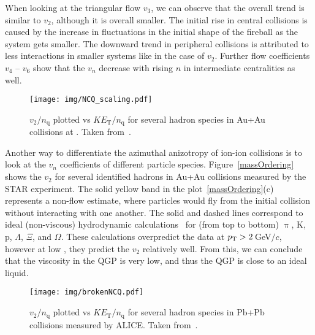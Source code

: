 When looking at the triangular flow $v_3$, we can observe that the overall trend is similar to $v_2$, although it is overall smaller. The initial rise in central collisions is caused by the increase in fluctuations in the initial shape of the fireball as the system gets smaller. The downward trend in peripheral collisions is attributed to less interactions in smaller systems like in the case of $v_2$\@. Further flow coefficients $v_4$ -- $v_6$ show that the $v_n$ decrease with rising $n$ in intermediate centralities as well.


 
\begin{figure}[!htb]
\centering
\texttt{[image: img/NCQ\_scaling.pdf]}
\caption[$v_2/n_\mathrm{q}$ plotted vs $K E_\mathrm{T}/n_\mathrm{q}$ for several hadron species in Au+Au collisions.]{\label{NCQscaling}$v_2/n_\mathrm{q}$ plotted vs $K E_\mathrm{T}/n_\mathrm{q}$ for several hadron species in Au+Au collisions at \snnFull\@. Taken from~\cite{NCQscalingPhenix}.}

\end{figure}


Another way to differentiate the azimuthal anizotropy of ion-ion collisions is to look at the $v_n$ coefficients of different particle species. Figure~\ref{massOrdering} shows the $v_2$ for several identified hadrons in Au+Au collisions measured by the STAR experiment. The solid yellow band in the plot~\ref{massOrdering}(c) represents a non-flow estimate, where particles would fly from the initial collision without interacting with one another. The solid and dashed lines correspond to ideal (non-viscous) hydrodynamic calculations~\cite{idealHydroReview} for (from top to bottom) $\uppi$, K, p, $\Lambda$, $\Xi$, and $\Omega$\@. These calculations overpredict the data at ${p_{\mathrm{T}}} > 2\,$GeV$/c$, however at low \pt, they predict the $v_2$ relatively well. From this, we can conclude that the viscosity in the QGP is very low, and thus the QGP is close to an ideal liquid. 


\begin{figure}[!htb]
\centering
\texttt{[image: img/brokenNCQ.pdf]}
\caption[$v_2/n_\mathrm{q}$ plotted vs $K E_\mathrm{T}/n_\mathrm{q}$ for several hadron species in Pb+Pb collisions measured by ALICE.]{\label{brokenNCQ}$v_2/n_\mathrm{q}$ plotted vs $K E_\mathrm{T}/n_\mathrm{q}$ for several hadron species in Pb+Pb collisions measured by ALICE\@. Taken from~\cite{ALICEncq}.}

\end{figure}

